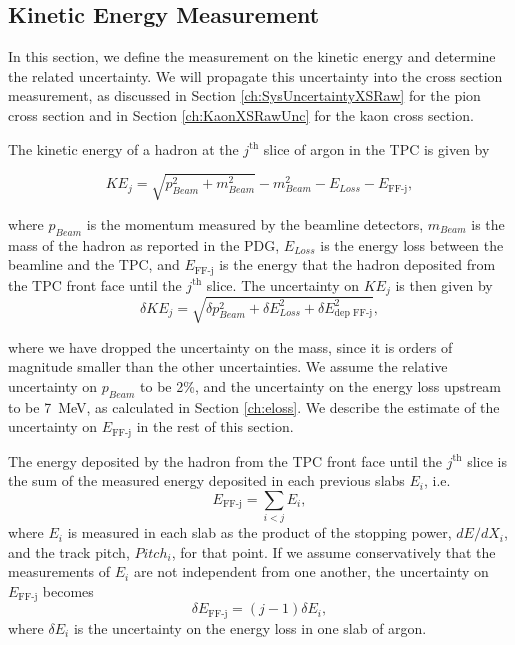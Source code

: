 \subsection{Kinetic Energy Measurement}\label{ch:kinEn}
In this section, we define the measurement on the kinetic energy and  determine the related uncertainty. We will propagate this uncertainty into the cross section measurement, as discussed in Section \ref{ch:SysUncertaintyXSRaw} for the pion cross section and in Section \ref{ch:KaonXSRawUnc} for the kaon cross section.

The kinetic energy of a hadron at the $j^{\text{th}}$ slice of argon in the TPC is given by

\begin{equation}
KE_{j} = \sqrt{p_{Beam}^2 + m_{Beam}^2} - m_{Beam}^2 - E_{Loss} - E_{\text{FF-j}},
\end{equation}

where $p_{Beam}$ is the momentum measured by the beamline detectors,  $m_{Beam}$ is the mass of the hadron as reported in the PDG,  $E_{Loss}$  is the energy loss between the beamline and the TPC, and $ E_{\text{FF-j}}$ is the energy that the hadron deposited from the TPC front face until the $j^{\text{th}}$ slice.
The uncertainty on $KE_{j}$ is then given by 
\begin{equation}
\delta KE_{j} = \sqrt{\delta p_{Beam}^2 + \delta E_{Loss}^2 +  \delta  E_{\text{dep FF-j}}^2},
\end{equation}

where we have dropped the uncertainty on the mass, since it is orders of magnitude smaller than the other uncertainties.
We assume the relative uncertainty on $p_{Beam}$ to be 2\%, and the uncertainty on the energy loss upstream to be 7~MeV, as calculated in Section \ref{ch:eloss}. We describe the estimate of the uncertainty on $E_{\text{FF-j}}$ in the rest of this section.

The energy deposited by the hadron from the TPC front face until the $j^{\text{th}}$ slice is the sum of the measured energy deposited in each previous slabs $E_{i}$, i.e.
\begin{equation}
E_{\text{FF-j}} = \sum_{i<j} E_{i}, 
\end{equation}
where $E_{i}$ is measured in each slab as  the product of the stopping power,  $dE/dX_{i}$,  and the track pitch, $Pitch_i$, for that point. 
If we assume conservatively that the measurements of $E_{i}$ are not independent from one another, the uncertainty on $E_{\text{FF-j}}$ becomes
\begin{equation}
\delta E_{\text{FF-j}} = (j-1) \delta E_{i}, 
\end{equation}
where $\delta E_{i}$ is the uncertainty on the energy loss in one slab of argon.

